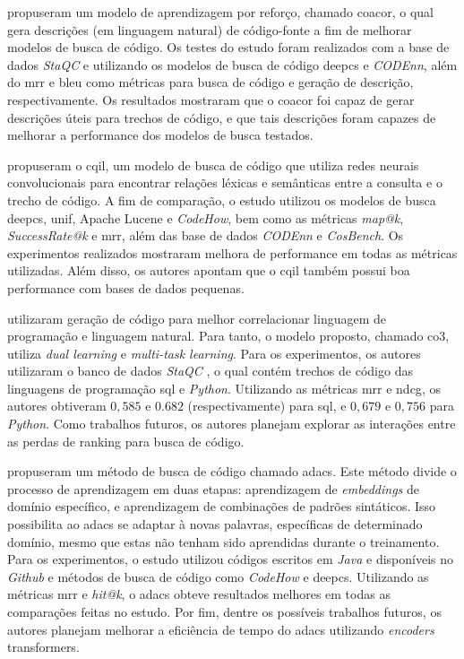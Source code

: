 \textcite{Yao2019CoaCorCA} propuseram um modelo de aprendizagem por reforço, chamado \gls{coacor}, o qual gera descrições (em linguagem natural) de código-fonte a fim de melhorar modelos de busca de código. Os testes do estudo foram realizados com a base de dados \textit{StaQC} \cite{Yao2018StaQCAS} e utilizando os modelos de busca de código \gls{deepcs} e \textit{CODEnn}, além do \gls{mrr} e \gls{bleu} como métricas para busca de código e geração de descrição, respectivamente. Os resultados mostraram que o \gls{coacor} foi capaz de gerar descrições úteis para trechos de código, e que tais descrições foram capazes de melhorar a performance dos modelos de busca testados.

\textcite{Li2020LearningCI} propuseram o \gls{cqil}, um modelo de busca de código que utiliza redes neurais convolucionais para encontrar relações léxicas e semânticas entre a consulta e o trecho de código. A fim de comparação, o estudo utilizou os modelos de busca \gls{deepcs}, \gls{unif}, Apache Lucene e \textit{CodeHow}, bem como as métricas \textit{map@k}, \textit{SuccessRate@k} e \gls{mrr}, além das base de dados \textit{CODEnn} e \textit{CosBench}. Os experimentos realizados mostraram melhora de performance em todas as métricas utilizadas. Além disso, os autores apontam que o \gls{cqil} também possui boa performance com bases de dados pequenas.

\textcite{Ye2020LeveragingCG} utilizaram geração de código para melhor correlacionar linguagem de programação e linguagem natural. Para tanto, o modelo proposto, chamado \gls{co3}, utiliza \textit{dual
learning} e \textit{multi-task learning}. Para os experimentos, os autores utilizaram o banco de dados \textit{StaQC} \cite{Yao2018StaQCAS}, o qual contém trechos de código das linguagens de programação \gls{sql} e \textit{Python}. Utilizando as métricas \gls{mrr} e \gls{ndcg}, os autores obtiveram $0,585$ e $0.682$ (respectivamente) para \gls{sql}, e $0,679$ e  $0,756$ para \textit{Python}. Como trabalhos futuros, os autores planejam explorar as interações entre as perdas de ranking para busca de código.

\textcite{Ling2020AdaptiveDC} propuseram um método de busca de código chamado \gls{adacs}. Este método divide o processo de aprendizagem em duas etapas: aprendizagem de \textit{embeddings} de domínio específico, e aprendizagem de combinações de padrões sintáticos. Isso possibilita ao \gls{adacs} se adaptar à novas palavras, específicas de determinado domínio, mesmo que estas não tenham sido aprendidas durante o treinamento. Para os experimentos, o estudo utilizou códigos escritos em \textit{Java} e disponíveis no \textit{Github} e métodos de busca de código como \textit{CodeHow} e \gls{deepcs}. Utilizando as métricas \gls{mrr} e \textit{hit@k}, o \gls{adacs} obteve resultados melhores em todas as comparações feitas no estudo. Por fim, dentre os possíveis trabalhos futuros, os autores planejam melhorar a eficiência de tempo do \gls{adacs} utilizando \textit{encoders} transformers.

